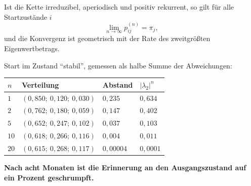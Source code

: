 \begin{merksatz}
Ist die Kette irreduzibel, aperiodisch und positiv rekurrent, so gilt für alle Startzustände $i$
\[ \lim_{n\to\infty} p^{(n)}_{ij} = \pi_j , \]
und die Konvergenz ist geometrisch mit der Rate des zweitgrößten Eigenwertbetrags.

Start im Zustand \enquote{stabil}, gemessen als halbe Summe der Abweichungen:

\begin{center}
{\small
\renewcommand{\arraystretch}{1.46}
\begin{tabular}{@{}P{1.4cm}P{4.2cm}P{1.8cm}P{1.8cm}@{}}
\toprule
$n$ & \textbf{Verteilung} & \textbf{Abstand} & $|\lambda_2|^{n}$\\
\midrule
$1$ & $(0{,}850;\ 0{,}120;\ 0{,}030)$ & $0{,}235$ & $0{,}634$\\
$2$ & $(0{,}762;\ 0{,}180;\ 0{,}059)$ & $0{,}147$ & $0{,}402$\\
$5$ & $(0{,}652;\ 0{,}247;\ 0{,}102)$ & $0{,}037$ & $0{,}103$\\
$10$ & $(0{,}618;\ 0{,}266;\ 0{,}116)$ & $0{,}004$ & $0{,}011$\\
$20$ & $(0{,}615;\ 0{,}268;\ 0{,}117)$ & $0{,}00004$ & $0{,}0001$\\
\bottomrule
\end{tabular}}
\end{center}

\begin{center}
\begin{minipage}{0.9\textwidth}
\textbf{Nach acht Monaten ist die Erinnerung an den Ausgangszustand auf ein Prozent geschrumpft.}
\end{minipage}
\end{center}

\begin{center}
\begin{minipage}{0.88\textwidth}
\end{minipage}
\end{center}
\end{merksatz}

